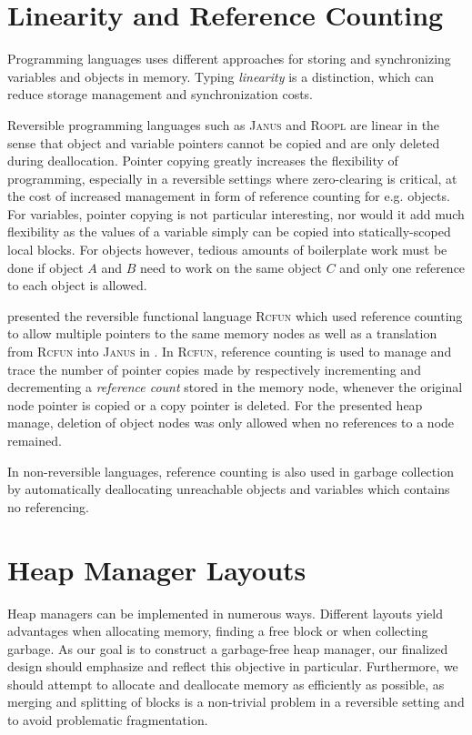 \section{Linearity and Reference Counting}
\label{sec:referencing}
Programming languages uses different approaches for storing and synchronizing variables and objects in memory. Typing \textit{linearity} is a distinction, which can reduce storage management and synchronization costs. %

Reversible programming languages such as \textsc{Janus} and \textsc{Roopl} are linear in the sense that object and variable pointers cannot be copied and are only deleted during deallocation. Pointer copying greatly increases the flexibility of programming, especially in a reversible settings where zero-clearing is critical, at the cost of increased management in form of reference counting for e.g. objects. For variables, pointer copying is not particular interesting, nor would it add much flexibility as the values of a variable simply can be copied into statically-scoped local blocks. For objects however, tedious amounts of boilerplate work must be done if object $A$ and $B$ need to work on the same object $C$ and only one reference to each object is allowed.

 \citeauthor{tm:refcounting} presented the reversible functional language \textsc{Rcfun} which used reference counting to allow multiple pointers to the same memory nodes as well as a translation from \textsc{Rcfun} into \textsc{Janus} in \cite{tm:refcounting}. In \textsc{Rcfun}, reference counting is used to manage and trace the number of pointer copies made by respectively incrementing and decrementing a \textit{reference count} stored in the memory node, whenever the original node pointer is copied or a copy pointer is deleted. For the presented heap manage, deletion of object nodes was only allowed when no references to a node remained.

In non-reversible languages, reference counting is also used in garbage collection by automatically deallocating unreachable objects and variables which contains no referencing. 


\section{Heap Manager Layouts}
\label{sec:heap-manager-layout}
Heap managers can be implemented in numerous ways. Different layouts yield advantages when allocating memory, finding a free block or when collecting garbage. As our goal is to construct a garbage-free heap manager, our finalized design should emphasize and reflect this objective in particular. Furthermore, we should attempt to allocate and deallocate memory as efficiently as possible, as merging and splitting of blocks is a non-trivial problem in a reversible setting and to avoid problematic fragmentation.

